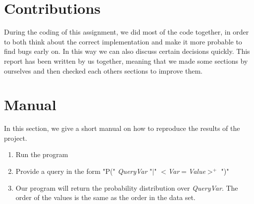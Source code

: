 \documentclass[10pt,a4paper]{article}
\begin{document}
\section{Contributions}
During the coding of this assignment, we did most of the code together, in order to both think about the correct implementation and make it more probable to find bugs early on. In this way we can also discuss certain decisions quickly. This report has been written by us together, meaning that we made some sections by ourselves and then checked each others sections to improve them.
\section{Manual}
In this section, we give a short manual on how to reproduce the results of the project. 

\begin{enumerate}
\item Run the program
\item Provide a query in the form "P(" \emph{QueryVar} "$|$" $<$\emph{Var}$=$\emph{Value}$>^+$ ")"
\item Our program will return the probability distribution over \emph{QueryVar}. The order of the values is the same as the order in the data set.
\end{enumerate}
\end{document}
